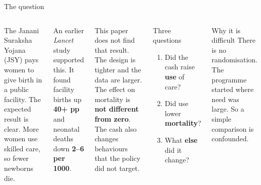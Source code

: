 \documentclass[aspectratio=169,11pt]{beamer}
\newcommand{\kn}[1]{{\color{jsyred}\bfseries #1}}
\begin{document}
\begin{frame}{The question}
  \begin{columns}[T]
    The Janani Suraksha Yojana (JSY) pays women to give birth in a public facility. The expected result is clear. More women use skilled care, so fewer newborns die.
    \vspace{0.5em}

    An earlier \emph{Lancet} study supported this. It found facility births up \kn{40+ pp} and neonatal deaths down \kn{2--6 per 1000}.
    \vspace{0.5em}

    This paper does not find that result. The design is tighter and the data are larger. The effect on mortality is \kn{not different from zero}. The cash also changes behaviours that the policy did not target.
    \begin{block}{Three questions}
      \begin{enumerate}
        \item Did the cash raise \textbf{use} of care?
        \item Did use lower \textbf{mortality}?
        \item What \textbf{else} did it change?
      \end{enumerate}
    \end{block}
    \begin{alertblock}{Why it is difficult}
      There is no randomisation. The programme started where need was large. So a simple comparison is confounded.
    \end{alertblock}
  \end{columns}
\end{frame}
\end{document}
